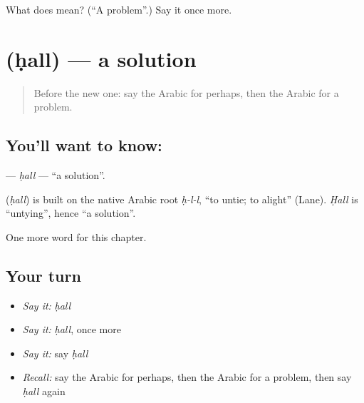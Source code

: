 \begin{tcolorbox}[breakable,colback=teal!4,colframe=teal!35!black,title={Before you move on}]
What does  mean? (\textquotedblleft{}A problem\textquotedblright{}.) Say it once more.
\end{tcolorbox}
\section[\texorpdfstring{\ar{حل} (ḥall)}{حل (ḥall)}]{ (ḥall) — a solution}

\label{lesson:AR-C206-hall}



\begin{quote}
Before the new one: say the Arabic for perhaps, then the Arabic for a problem.
\end{quote}

\subsection*{You'll want to know: }
\textbf{} — \emph{ḥall} — \textquotedblleft{}a solution\textquotedblright{}.

\begin{cousinweb}
\textbf{} (\emph{ḥall}) is built on the native Arabic root \emph{ḥ-l-l}, \textquotedblleft{}to untie; to alight\textquotedblright{} (Lane). \emph{Ḥall} is \textquotedblleft{}untying\textquotedblright{}, hence \textquotedblleft{}a solution\textquotedblright{}.
\end{cousinweb}

\begin{grammarlens}[title={What you've built}]
One more word for this chapter.
\end{grammarlens}

\subsection*{Your turn}
\begin{itemize}
\raggedright
  \item \emph{Say it:} \emph{ḥall}
  \item \emph{Say it:} \emph{ḥall}, once more
  \item \emph{Say it:} say \emph{ḥall}
  \item \emph{Recall:} say the Arabic for perhaps, then the Arabic for a problem, then say \emph{ḥall} again
\end{itemize}


